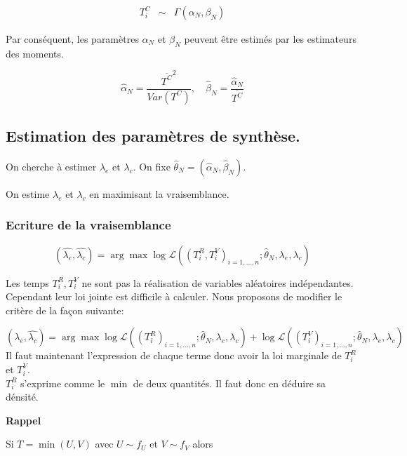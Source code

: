 \documentclass[
  letterpaper,
  DIV=11,
  numbers=noendperiod]{scrartcl}
\begin{document}
\[
\begin{array}{ccl}
T_i^{C} &\sim& \Gamma(\alpha_N, \beta_N)
\end{array}
\]

Par conséquent, les paramètres \(\alpha_N\) et \(\beta_N\) peuvent être
estimés par les estimateurs des moments.

\[\widehat{\alpha}_N = \frac{\overline{T^C}^2}{Var(T^C)}, \quad \widehat{\beta}_N = \frac{\widehat{\alpha}_N}{\overline{T^C}}\]

\hypertarget{estimation-des-paramuxe8tres-de-synthuxe8se.}{%
\subsection{Estimation des paramètres de
synthèse.}\label{estimation-des-paramuxe8tres-de-synthuxe8se.}}

On cherche à estimer \(\lambda_e\) et \(\lambda_c\). On fixe
\(\hat{\theta}_N = (\widehat{\alpha}_N,\widehat{\beta}_N)\).

On estime \(\lambda_e\) et \(\lambda_c\) en maximisant la vraisemblance.

\hypertarget{ecriture-de-la-vraisemblance}{%
\subsubsection{Ecriture de la
vraisemblance}\label{ecriture-de-la-vraisemblance}}

\[(\widehat{\lambda_e}, \widehat{\lambda_c}) = \arg\max \log \mathcal{L} \left((T_i^R,T_i^V)_{i=1,\dots,n}; \widehat{\theta}_N,\lambda_e,\lambda_c\right)
\]

Les temps \(T_i^R,T_i^V\) ne sont pas la réalisation de variables
aléatoires indépendantes. Cependant leur loi jointe est difficile à
calculer. Nous proposons de modifier le critère de la façon suivante:

\[ (\widehat{\lambda_e}, \widehat{\lambda_c}) = \arg\max \log \mathcal{L} \left((T_i^R)_{i=1,\dots,n}; \widehat{\theta}_N,\lambda_e,\lambda_c\right) + \log \mathcal{L} \left((T_i^V)_{i=1,\dots,n}; \widehat{\theta}_N,\lambda_e,\lambda_c\right)
\] Il faut maintenant l'expression de chaque terme donc avoir la loi
marginale de \(T_i^R\) et \(T_i^V\).\\

\(T_i^R\) s'exprime comme le \(\min\) de deux quantités. Il faut donc en
déduire sa dénsité.

\textbf{Rappel}

Si \(T = \min(U,V)\) avec \(U \sim f_U\) et \(V \sim f_V\) alors
\end{document}
